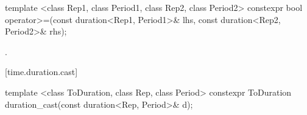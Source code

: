 %
%
\begin{itemdecl}
template <class Rep1, class Period1, class Rep2, class Period2>
  constexpr bool operator>=(const duration<Rep1, Period1>& lhs, const duration<Rep2, Period2>& rhs);
\end{itemdecl}

\begin{itemdescr}
\pnum
\returns {}.
\end{itemdescr}

[time.duration.cast]{}

%
%
\begin{itemdecl}
template <class ToDuration, class Rep, class Period>
  constexpr ToDuration duration_cast(const duration<Rep, Period>& d);
\end{itemdecl}

